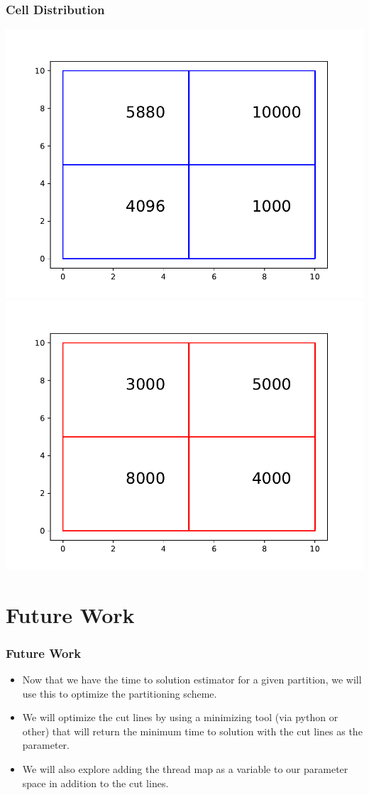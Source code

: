 \documentclass[xcolor={usenames,dvipsnames,svgnames,table}]{beamer}
\begin{document}
\begin{frame}[t]\frametitle{Cell Distribution}
\includegraphics[trim={1cm 0cm 1cm 1cm},clip,scale=0.45]{figures/layer1partitioning.pdf}
\includegraphics[trim={1cm 0cm 1cm 1cm},clip,scale=0.45]{figures/layer2partitioning.pdf}
\end{frame}

\section{Future Work}

\begin{frame}[t]\frametitle{Future Work}
\begin{block}{}
\begin{itemize}
	\item Now that we have the time to solution estimator for a given partition, we will use this to optimize the partitioning scheme. 
	\item We will optimize the cut lines by using a minimizing tool (via python or other) that will return the minimum time to solution with the cut lines as the parameter.
	\item We will also explore adding the thread map as a variable to our parameter space in addition to the cut lines.
\end{itemize}
\end{block}
\end{frame}
\end{document}
